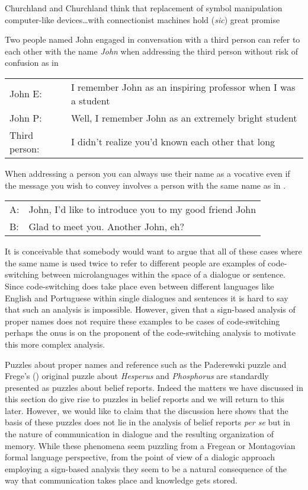 \begin{ex} 

Churchland and Churchland think that replacement of symbol
manipulation computer-like devices\ldots with connectionist machines
hold (\textit{sic}) great promise 

\hfill\citep[][p. 21]{Globus1995} 
\end{ex} 
Two people named John engaged in conversation with a third person can
refer to each other with the name \textit{John} when addressing the
third person without risk of confusion as in \nexteg{}
\begin{ex} 
\begin{tabular}[t]{ll}
John E: & I remember John as an inspiring professor when I was a
student \\
John P: & Well, I remember John as an extremely bright student \\
Third person: & I didn't realize you'd known each other that long
\end{tabular} 
\end{ex} 
When addressing a person you can always use their name as a vocative
even if the message you wish to convey involves a person with the same
name as in \nexteg{}.
\begin{ex} 
\begin{tabular}[t]{ll}
A: & John, I'd like to introduce you to my good friend John \\
B: & Glad to meet you.  Another John, eh?
\end{tabular} 
\end{ex} 
It is conceivable that somebody would want to argue that all of these
cases where the same name is used twice to refer to different people
are examples of code-switching between microlanguages within the space
of a dialogue or sentence.  Since code-switching does take place even
between different languages like English and Portuguese within single
dialogues and sentences it is hard to say that such an analysis is
impossible.  However, given that a sign-based analysis of proper names
does not require these examples to be cases of code-switching perhaps
the onus is on the proponent of the code-switching analysis to
motivate this more complex analysis. 

Puzzles about proper names and reference such as the Paderewski puzzle
and Frege's (\citeyear{Frege1892}) original puzzle about
\textit{Hesperus} and \textit{Phosphorus} are standardly presented as
puzzles about belief reports.  Indeed the matters we have discussed in
this section do give rise to puzzles in belief reports and we will
return to this later.  However, we would like to claim that
the discussion here shows that the basis of these puzzles does not lie in
the analysis of belief reports \textit{per se} but in the nature of
communication in dialogue and the resulting organization of memory.
While these phenomena seem puzzling from a Fregean or Montagovian
formal language perspective, from the point of view of a dialogic
approach employing a sign-based analysis they seem to be a natural
consequence of the way that communication takes place and knowledge
gets stored.

